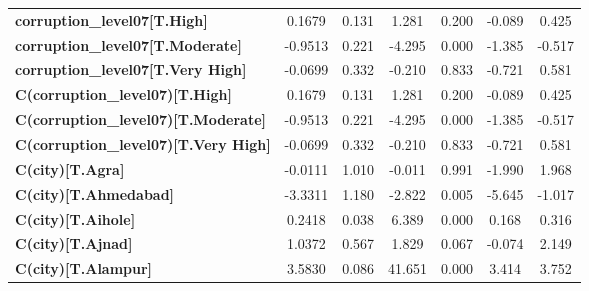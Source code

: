 \begin{center}
\begin{tabular}{lcccccc}
\textbf{corruption\_level07[T.High]}                                                                &       0.1679  &        0.131     &     1.281  &         0.200        &       -0.089    &        0.425     \\
\textbf{corruption\_level07[T.Moderate]}                                                            &      -0.9513  &        0.221     &    -4.295  &         0.000        &       -1.385    &       -0.517     \\
\textbf{corruption\_level07[T.Very High]}                                                           &      -0.0699  &        0.332     &    -0.210  &         0.833        &       -0.721    &        0.581     \\
\textbf{C(corruption\_level07)[T.High]}                                                             &       0.1679  &        0.131     &     1.281  &         0.200        &       -0.089    &        0.425     \\
\textbf{C(corruption\_level07)[T.Moderate]}                                                         &      -0.9513  &        0.221     &    -4.295  &         0.000        &       -1.385    &       -0.517     \\
\textbf{C(corruption\_level07)[T.Very High]}                                                        &      -0.0699  &        0.332     &    -0.210  &         0.833        &       -0.721    &        0.581     \\
\textbf{C(city)[T.Agra]}                                                                            &      -0.0111  &        1.010     &    -0.011  &         0.991        &       -1.990    &        1.968     \\
\textbf{C(city)[T.Ahmedabad]}                                                                       &      -3.3311  &        1.180     &    -2.822  &         0.005        &       -5.645    &       -1.017     \\
\textbf{C(city)[T.Aihole]}                                                                          &       0.2418  &        0.038     &     6.389  &         0.000        &        0.168    &        0.316     \\
\textbf{C(city)[T.Ajnad]}                                                                           &       1.0372  &        0.567     &     1.829  &         0.067        &       -0.074    &        2.149     \\
\textbf{C(city)[T.Alampur]}                                                                         &       3.5830  &        0.086     &    41.651  &         0.000        &        3.414    &        3.752     \\

\end{tabular}
\end{center}
